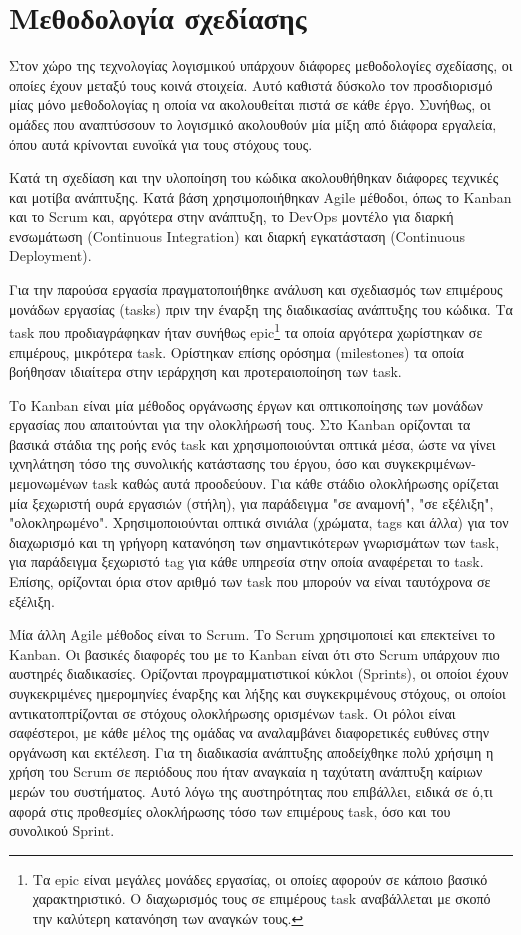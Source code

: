 \section{Μεθοδολογία σχεδίασης} \label{section:3-3-design-methodology}

Στον χώρο της τεχνολογίας λογισμικού υπάρχουν διάφορες μεθοδολογίες σχεδίασης, οι οποίες έχουν μεταξύ τους κοινά στοιχεία. Αυτό καθιστά δύσκολο τον προσδιορισμό μίας μόνο μεθοδολογίας η οποία να ακολουθείται πιστά σε κάθε έργο. Συνήθως, οι ομάδες που αναπτύσσουν το λογισμικό ακολουθούν μία μίξη από διάφορα εργαλεία, όπου αυτά κρίνονται ευνοϊκά για τους στόχους τους. %

Κατά τη σχεδίαση και την υλοποίηση του κώδικα ακολουθήθηκαν διάφορες τεχνικές και μοτίβα ανάπτυξης. Κατά βάση χρησιμοποιήθηκαν Agile μέθοδοι, όπως το Kanban και το Scrum και, αργότερα στην ανάπτυξη, το DevOps μοντέλο για διαρκή ενσωμάτωση (Continuous Integration) και διαρκή εγκατάσταση (Continuous Deployment).

Για την παρούσα εργασία πραγματοποιήθηκε ανάλυση και σχεδιασμός των επιμέρους μονάδων εργασίας (tasks) πριν την έναρξη της διαδικασίας ανάπτυξης του κώδικα. Τα task που προδιαγράφηκαν ήταν συνήθως epic\footnote{Τα epic είναι μεγάλες μονάδες εργασίας, οι οποίες αφορούν σε κάποιο βασικό χαρακτηριστικό. Ο διαχωρισμός τους σε επιμέρους task αναβάλλεται με σκοπό την καλύτερη κατανόηση των αναγκών τους.} τα οποία αργότερα χωρίστηκαν σε επιμέρους, μικρότερα task. Ορίστηκαν επίσης ορόσημα (milestones) τα οποία βοήθησαν ιδιαίτερα στην ιεράρχηση και προτεραιοποίηση των task.

Το Kanban είναι μία μέθοδος οργάνωσης έργων και οπτικοποίησης των μονάδων εργασίας που απαιτούνται για την ολοκλήρωσή τους. Στο Kanban ορίζονται τα βασικά στάδια της ροής ενός task και χρησιμοποιούνται οπτικά μέσα, ώστε να γίνει ιχνηλάτηση τόσο της συνολικής κατάστασης του έργου, όσο και συγκεκριμένων-μεμονωμένων task καθώς αυτά προοδεύουν. Για κάθε στάδιο ολοκλήρωσης ορίζεται μία ξεχωριστή ουρά εργασιών (στήλη), για παράδειγμα "σε αναμονή", "σε εξέλιξη", "ολοκληρωμένο". Χρησιμοποιούνται οπτικά σινιάλα (χρώματα, tags και άλλα) για τον διαχωρισμό και τη γρήγορη κατανόηση των σημαντικότερων γνωρισμάτων των task, για παράδειγμα ξεχωριστό tag για κάθε υπηρεσία στην οποία αναφέρεται το task. Επίσης, ορίζονται όρια στον αριθμό των task που μπορούν να είναι ταυτόχρονα σε εξέλιξη.

Μία άλλη Agile μέθοδος είναι το Scrum. Το Scrum χρησιμοποιεί και επεκτείνει το Kanban. Οι βασικές διαφορές του με το Kanban είναι ότι στο Scrum υπάρχουν πιο αυστηρές διαδικασίες. Ορίζονται προγραμματιστικοί κύκλοι (Sprints), οι οποίοι έχουν συγκεκριμένες ημερομηνίες έναρξης και λήξης και συγκεκριμένους στόχους, οι οποίοι αντικατοπτρίζονται σε στόχους ολοκλήρωσης ορισμένων task. Οι ρόλοι είναι σαφέστεροι, με κάθε μέλος της ομάδας να αναλαμβάνει διαφορετικές ευθύνες στην οργάνωση και εκτέλεση. Για τη διαδικασία ανάπτυξης αποδείχθηκε πολύ χρήσιμη η χρήση του Scrum σε περιόδους που ήταν αναγκαία η ταχύτατη ανάπτυξη καίριων μερών του συστήματος. Αυτό λόγω της αυστηρότητας που επιβάλλει, ειδικά σε ό,τι αφορά στις προθεσμίες ολοκλήρωσης τόσο των επιμέρους task, όσο και του συνολικού Sprint.


